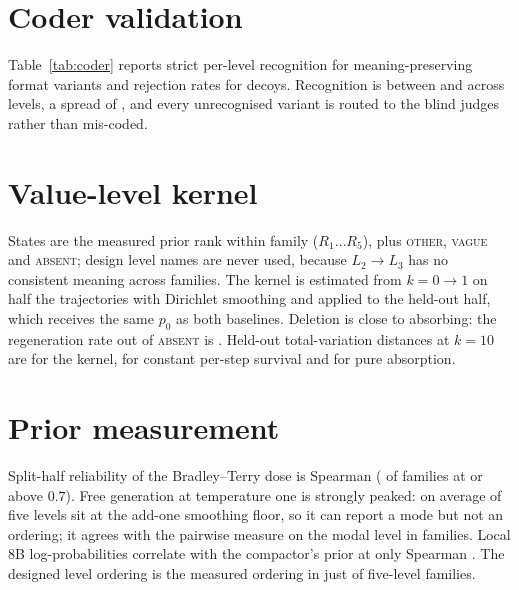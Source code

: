 

\section{Coder validation}
\label{app:coder}

Table~\ref{tab:coder} reports strict per-level recognition for meaning-preserving format variants and
rejection rates for decoys. Recognition is between \CoderMin{} and \CoderMax{} across levels, a
spread of \CoderSpread{}, and every unrecognised variant is routed to the blind judges rather than
mis-coded.

\section{Value-level kernel}
\label{app:kernel}
States are the measured prior rank within family ($R_1\ldots R_5$), plus \textsc{other},
\textsc{vague} and \textsc{absent}; design level names are never used, because $L_2\rightarrow L_3$
has no consistent meaning across families. The kernel is estimated from $k{=}0\rightarrow1$ on half
the trajectories with Dirichlet smoothing and applied to the held-out half, which receives the same
$p_0$ as both baselines. Deletion is close to absorbing: the regeneration rate out of \textsc{absent}
is \RegenRate{}. Held-out total-variation distances at $k{=}10$ are \KernelTVD{} for the kernel,
\KernelConstTVD{} for constant per-step survival and \KernelAbsorbTVD{} for pure absorption.

\section{Prior measurement}
\label{app:priors}

Split-half reliability of the Bradley--Terry dose is Spearman \SplitHalfRho{}
(\SplitHalfFrac{} of families at or above $0.7$). Free generation at temperature one is strongly
peaked: on average \PTwoFloor{} of five levels sit at the add-one smoothing floor, so it can report a
mode but not an ordering; it agrees with the pairwise measure on the modal level in
\PTwoModeAgree{} families. Local 8B log-probabilities correlate with the compactor's prior at only
Spearman \PThreeRho{}. The designed level ordering is the measured ordering in just
\DesignOrderAgree{} of five-level families.
